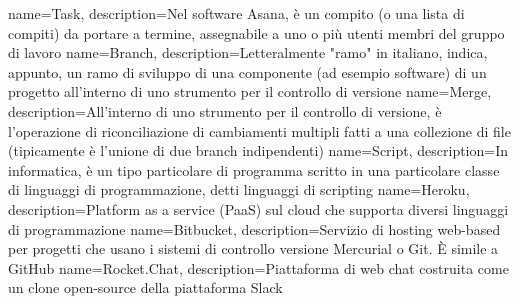  {
	name=Task,
	description={Nel software Asana, è un compito (o una lista di compiti) da portare a termine,
	assegnabile a uno o più utenti membri del gruppo di lavoro}
}
 {
	name=Branch,
	description={Letteralmente "ramo" in italiano, indica, appunto, un ramo di sviluppo di una
	componente (ad esempio software) di un progetto all'interno di uno strumento per il controllo
	di versione}
}
 {
	name=Merge,
	description={All'interno di uno strumento per il controllo di versione, è l'operazione di
	riconciliazione di cambiamenti multipli fatti a una collezione di file (tipicamente è
	l'unione di due branch indipendenti)}
}
 {
	name=Script,
	description={In informatica, è un tipo particolare di programma scritto in una particolare	classe di linguaggi di programmazione, detti linguaggi di scripting}
}
 {
	name=Heroku,
	description={Platform as a service (PaaS) sul cloud che supporta diversi linguaggi di
	programmazione}
}
 {
	name=Bitbucket,
	description={Servizio di hosting web-based per progetti che usano i sistemi di controllo
	versione Mercurial o Git. È simile a GitHub}
}
 {
	name=Rocket.Chat,
	description={Piattaforma di web chat costruita come un clone open-source della piattaforma
	Slack}
}